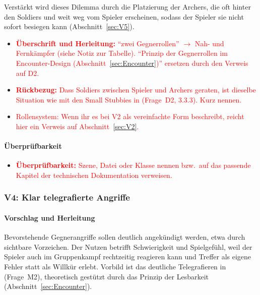 \documentclass[../Main.tex]{subfiles}
\begin{document}
Verstärkt wird dieses Dilemma durch die Platzierung der Archers, die oft hinter den Soldiers und weit weg vom Spieler erscheinen, sodass der Spieler sie nicht sofort besiegen kann (Abschnitt~\ref{sec:V5}).

\begin{itemize}[leftmargin=1.5cm]
    \item \textcolor{red}{\textbf{Überschrift und Herleitung:} \enquote{zwei Gegnerrollen} $\rightarrow$ Nah- und Fernkämpfer (siehe Notiz zur Tabelle). \enquote{Prinzip der Gegnerrollen im Encounter-Design (Abschnitt~\ref{sec:Encounter})} ersetzen durch den Verweis auf  D2.}
    \item \textcolor{red}{\textbf{Rückbezug:} Dass Soldiers zwischen Spieler und Archers geraten, ist dieselbe Situation wie mit den Small Stubbies in  (Frage~D2, 3.3.3). Kurz nennen.}
    \item \textcolor{red}{Rollensystem: Wenn ihr es bei V2 als vereinfachte Form beschreibt, reicht hier ein Verweis auf Abschnitt~\ref{sec:V2}.}
\end{itemize}

\paragraph{Überprüfbarkeit}
\begin{itemize}[leftmargin=1.5cm]
    \item \textcolor{red}{\textbf{Überprüfbarkeit:} Szene, Datei oder Klasse nennen bzw.\ auf das passende Kapitel der technischen Dokumentation verweisen.}
\end{itemize}

\subsubsection{V4: Klar telegrafierte Angriffe} \label{sec:V4}

\paragraph{Vorschlag und Herleitung}
Bevorstehende Gegnerangriffe sollen deutlich angekündigt werden, etwa durch sichtbare Vorzeichen. Der Nutzen betrifft Schwierigkeit und Spielgefühl, weil der Spieler auch im Gruppenkampf rechtzeitig reagieren kann und Treffer als eigene Fehler statt als Willkür erlebt. Vorbild ist das deutliche Telegrafieren in  (Frage~M2), theoretisch gestützt durch das Prinzip der Lesbarkeit (Abschnitt~\ref{sec:Encounter}).
\end{document}
